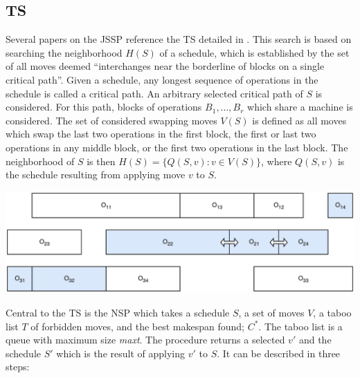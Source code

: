 \documentclass[paper=a4, fontsize=9pt]{scrartcl}
\begin{document}
\begin{multicols}{2}
\section*{\acl{TS}}

Several papers \cite{sha2006hybrid}\cite{blum2004ant} on the \ac{JSSP} reference the \ac{TS} detailed in \cite{nowicki1996fast}. This search is based on searching the neighborhood $H(S)$ of a schedule, which is established by the set of all moves deemed ``interchanges near the borderline of blocks on a single critical path''. Given a schedule, any longest sequence of operations in the schedule is called a critical path. An arbitrary selected critical path of $S$ is considered. For this path, blocks of operations $B_1, \ldots, B_r$ which share a machine is considered. The set of considered swapping moves $V(S)$ is defined as all moves which swap the last two operations in the first block, the first or last two operations in any middle block, or the first two operations in the last block. The neighborhood of $S$ is then $H(S) = \{ Q(S, v) : v \in V(S)\}$, where $Q(S, v)$ is the schedule resulting from applying move $v$ to $S$.

{
\vspace{0.3cm}
\centering
\includegraphics[scale=0.1]{figures/permve-ntnu-it3708-project-4-2017-neighborhood}
\label{figure:neighborhood}
\vspace{0.3cm}
}

Central to the \ac{TS} is the \ac{NSP} which takes a schedule $S$, a set of moves $V$, a taboo list $T$ of forbidden moves, and the best makespan found; $C^*$. The taboo list is a queue with maximum size \textit{maxt}. The procedure returns a selected $v'$ and the schedule $S'$ which is the result of applying $v'$ to $S$. It can be described in three steps:


\end{multicols}
\end{document}
